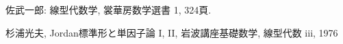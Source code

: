 \documentclass[12pt,twoside]{jarticle}
\begin{document}

\begin{thebibliography}{ABC}

 佐武一郎: 線型代数学, 裳華房数学選書 1, 324頁.

杉浦光夫, Jordan標準形と単因子論 I, II, 岩波講座基礎数学, 線型代数 iii, 1976






\end{thebibliography}

\end{document}
